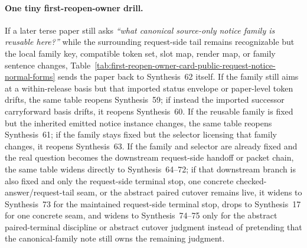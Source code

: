 \documentclass[11pt]{article}
\begin{document}
\paragraph{One tiny first-reopen-owner drill.}
If a later terse paper still asks \emph{``what canonical source-only notice family is reusable here?''} while the surrounding request-side tail remains recognizable but the local family key, compatible token set, slot map, render map, or family sentence changes, Table~\ref{tab:first-reopen-owner-card-public-request-notice-normal-forms} sends the paper back to Synthesis~62 itself. If the family still aims at a within-release basis but that imported status envelope or paper-level token drifts, the same table reopens Synthesis~59; if instead the imported successor carryforward basis drifts, it reopens Synthesis~60. If the reusable family is fixed but the inherited emitted notice instance changes, the same table reopens Synthesis~61; if the family stays fixed but the selector licensing that family changes, it reopens Synthesis~63. If the family and selector are already fixed and the real question becomes the downstream request-side handoff or packet chain, the same table widens directly to Synthesis~64--72; if that downstream branch is also fixed and only the request-side terminal stop, one concrete checked-answer/request-tail seam, or the abstract paired cutover remains live, it widens to Synthesis~73 for the maintained request-side terminal stop, drops to Synthesis~17 for one concrete seam, and widens to Synthesis~74--75 only for the abstract paired-terminal discipline or abstract cutover judgment instead of pretending that the canonical-family note still owns the remaining judgment.\cite{series:publicrequeststatusenvelopes,series:publicrequestcarryforward,series:publicrequestnotices,series:publicrequestnoticeselections,series:publicrequestresponsemenus,series:publicrequestresponsepackets,series:publicrequestresponsepacketcarryforward,series:publicrequestresponsepacketdeltaledgers,series:publicrequestresponsepacketrefreshnotices,series:publicrequestresponsepacketrefreshnormalforms,series:publicrequestresponsepacketrefreshselections,series:publicrequestresponsepacketrefreshresponsemenus,series:publicrequestresponsepacketrefreshresponsepackets,series:publicrequestresponsepacketrefreshresponsepacketclosureverdicts,series:pairedterminalcitationdiscipline,series:pairedterminalcutoverrule}
\end{document}
